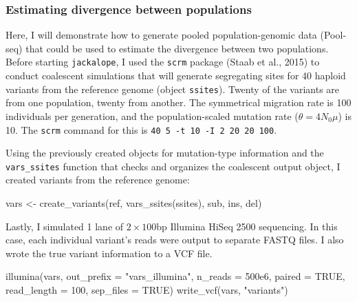 \documentclass[12pt,]{article}
\newenvironment{Shaded}{}{}
\newcommand{\DataTypeTok}[1]{#1}
\newcommand{\DecValTok}[1]{#1}
\newcommand{\FloatTok}[1]{#1}
\newcommand{\KeywordTok}[1]{\textcolor[rgb]{0.00,0.00,1.00}{#1}}
\newcommand{\NormalTok}[1]{#1}
\newcommand{\OtherTok}[1]{\textcolor[rgb]{1.00,0.25,0.00}{#1}}
\newcommand{\StringTok}[1]{\textcolor[rgb]{0.00,0.50,0.50}{#1}}
\begin{document}
\hypertarget{estimating-divergence-between-populations}{%
\subsubsection{Estimating divergence between populations}\label{estimating-divergence-between-populations}}

Here, I will demonstrate how to generate pooled population-genomic data (Pool-seq)
that could be used to estimate the divergence between two populations.
Before starting \texttt{jackalope}, I used the \texttt{scrm} package (Staab et al., 2015)
to conduct coalescent simulations that will generate segregating sites for 40
haploid variants from the reference genome (object \texttt{ssites}).
Twenty of the variants are from one population, twenty from another.
The symmetrical migration rate is 100 individuals per generation,
and the population-scaled mutation rate (\(\theta = 4 N_0 \mu\)) is 10.
The \texttt{scrm} command for this is \texttt{40\ 5\ -t\ 10\ -I\ 2\ 20\ 20\ 100}.

Using the previously created objects for mutation-type information and the
\texttt{vars\_ssites} function that checks and organizes the coalescent output object,
I created variants from the reference genome:

\begin{Shaded}
\begin{Highlighting}[]
\NormalTok{vars <-}\StringTok{ }\KeywordTok{create_variants}\NormalTok{(ref, }\KeywordTok{vars_ssites}\NormalTok{(ssites), sub, ins, del)}
\end{Highlighting}
\end{Shaded}

Lastly, I simulated 1 lane of \(2 \times 100\)bp Illumina HiSeq 2500 sequencing.
In this case, each individual variant's reads were output to separate FASTQ files.
I also wrote the true variant information to a VCF file.

\begin{Shaded}
\begin{Highlighting}[]
\KeywordTok{illumina}\NormalTok{(vars, }\DataTypeTok{out_prefix =} \StringTok{"vars_illumina"}\NormalTok{, }\DataTypeTok{n_reads =} \FloatTok{500e6}\NormalTok{, }\DataTypeTok{paired =} \OtherTok{TRUE}\NormalTok{,}
         \DataTypeTok{read_length =} \DecValTok{100}\NormalTok{, }\DataTypeTok{sep_files =} \OtherTok{TRUE}\NormalTok{)}
\KeywordTok{write_vcf}\NormalTok{(vars, }\StringTok{"variants"}\NormalTok{)}
\end{Highlighting}
\end{Shaded}
\end{document}
